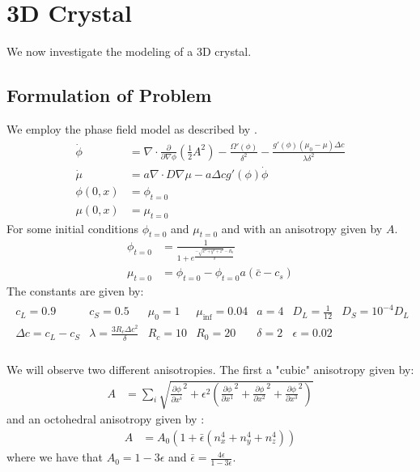 \section{3D Crystal}
We now investigate the modeling of a 3D crystal.
\subsection{Formulation of Problem}
We employ the phase field model as described by \cite{Bollada2023}.
\begin{align*}
    \dot \phi &= \nabla \cdot \frac{\partial}{\partial \nabla \phi}(\frac12 A^2)-\frac{\Omega'(\phi)}{\delta^2} - \frac{g'(\phi)(\mu_0-\mu)\Delta c}{\lambda \delta^2}\\
    \dot \mu &= a\nabla \cdot D \nabla \mu - a \Delta c g'(\phi)\dot \phi\\
    \phi(0,x) &= \phi_{t=0}\\
    \mu(0,x) &= \mu_{t=0}
\end{align*}
For some initial conditions $\phi_{t=0}$ and $\mu_{t=0}$ and with an anisotropy given by $A$.
\begin{align*}
    \phi_{t=0} &= \frac{1}{1+e^{\frac{-\sqrt{x^2 + y^2 + z^2}-R_0}{\delta}}}\\
    \mu_{t=0} &= \phi_{t=0} - \phi_{t=0}a(\bar c - c_s)
\end{align*}
The constants are given by:
\begin{align*}
    \begin{matrix}
    c_L = 0.9 & c_S = 0.5 & \mu_0 = 1 & \mu_{\inf} = 0.04 & a = 4 & D_L= \frac{1}{12} & D_S = 10^{-4}D_L\\
    \Delta c = c_L - c_S & \lambda = \frac{3R_c\Delta c^2}{\delta} & R_c = 10 & R_0 = 20 & \delta = 2 & \epsilon = 0.02\\
    \end{matrix}
\end{align*}

We will observe two different anisotropies.
The first a "cubic" anisotropy given by:
\begin{align*}
    A &= \sum_i \sqrt{\frac{\partial \phi}{\partial x^i}^2 + \epsilon^2(\frac{\partial \phi}{\partial x^1}^2 + \frac{\partial \phi}{\partial x^2}^2 + \frac{\partial \phi}{\partial x^3}^2)}
\end{align*}
and an octohedral anisotropy given by \cite{Bollada2015}:
\begin{align*}
    A &= A_0 (1 + \bar \epsilon(n^4_x+n^4_y+n^4_z))
\end{align*}
where we have that $A_0 =1 -3\epsilon$ and $\bar \epsilon = \frac{4\epsilon}{1-3\epsilon}$.


